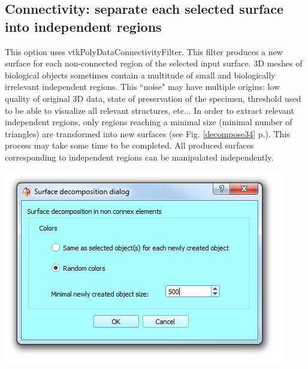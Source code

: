 \subsection{Connectivity: separate each selected surface into independent regions}
\noindent
\begin{minipage}{0.5\textwidth}
This option uses vtkPolyDataConnectivityFilter. This filter produces a new surface for each non-connected region of the selected input surface. 3D meshes of biological objects sometimes contain a multitude of small and biologically irrelevant independent regions. This ``noise" may have multiple origins: low quality of original 3D data, state of preservation of the specimen, threshold used to be able to visualize all relevant structures, etc... In order to extract relevant independent regions, only regions reaching a minimal size (minimal number of triangles) are transformed into new surfaces (see Fig. \ref{decompose34} p.\pageref{decompose34}). This process may take some time to be completed. All produced surfaces corresponding to independent regions can be manipulated independently.\end{minipage}    
\begin{minipage}{0.5\textwidth}\centering
  \includegraphics[scale=0.5]{images/09/structure/surface_decomposition_dialog.png}
 \end{minipage} 
\noindent


